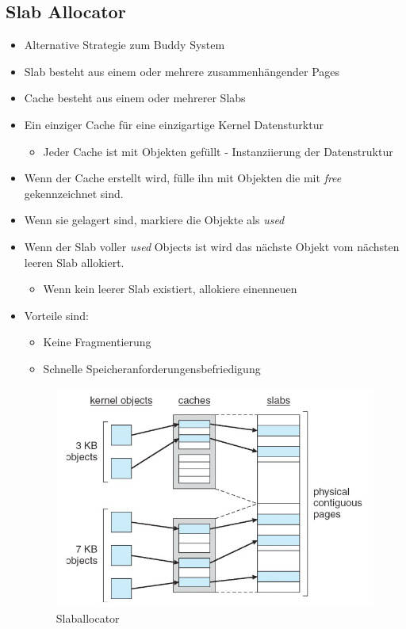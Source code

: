 \documentclass[a4paper]{scrreprt}
\begin{document}
\subsection{Slab Allocator}
\begin{itemize}
\item Alternative Strategie zum Buddy System
\item Slab besteht aus einem oder mehrere zusammenhängender Pages
\item Cache besteht aus einem oder mehrerer Slabs
\item Ein einziger Cache für eine einzigartige Kernel Datensturktur
\begin{itemize}
\item Jeder Cache ist mit Objekten gefüllt - Instanziierung der Datenstruktur
\end{itemize}
\item Wenn der Cache erstellt wird, fülle ihn mit Objekten die mit \textit{free} gekennzeichnet sind.
\item Wenn sie gelagert sind, markiere die Objekte als \textit{used}
\item Wenn der Slab voller \textit{used} Objects ist wird das nächste Objekt vom nächsten leeren Slab allokiert.
\begin{itemize}
\item Wenn kein leerer Slab existiert, allokiere einenneuen
\end{itemize}
\item Vorteile sind:
\begin{itemize}
\item Keine Fragmentierung
\item Schnelle Speicheranforderungensbefriedigung
\end{itemize}

\begin{figure}[ht]
\centering
\includegraphics[scale=0.6]{graphics/slab.png}
\caption{Slaballocator}
\end{figure}

\end{itemize}
\end{document}
